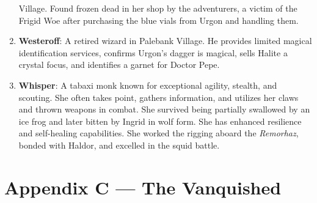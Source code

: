 \documentclass[
  letterpaper,12pt,twoside,twocolumn,openany,
  nodeprecatedcode,bg=full]{dndbook}
\begin{document}
\begin{enumerate}
  Village. Found frozen dead in her shop by the adventurers, a victim of
  the Frigid Woe after purchasing the blue vials from Urgon and handling
  them.
\item
  \textbf{Westeroff}: A retired wizard in Palebank Village. He provides
  limited magical identification services, confirms Urgon's dagger is
  magical, sells Halite a crystal focus, and identifies a garnet for
  Doctor Pepe.
\item
  \textbf{Whisper}: A tabaxi monk known for exceptional agility,
  stealth, and scouting. She often takes point, gathers information, and
  utilizes her claws and thrown weapons in combat. She survived being
  partially swallowed by an ice frog and later bitten by Ingrid in wolf
  form. She has enhanced resilience and self-healing capabilities. She
  worked the rigging aboard the \emph{Remorhaz}, bonded with Haldor, and
  excelled in the squid battle.
\end{enumerate}

\chapter{Appendix C --- The Vanquished}\label{appendix-c-the-vanquished}
\end{document}
